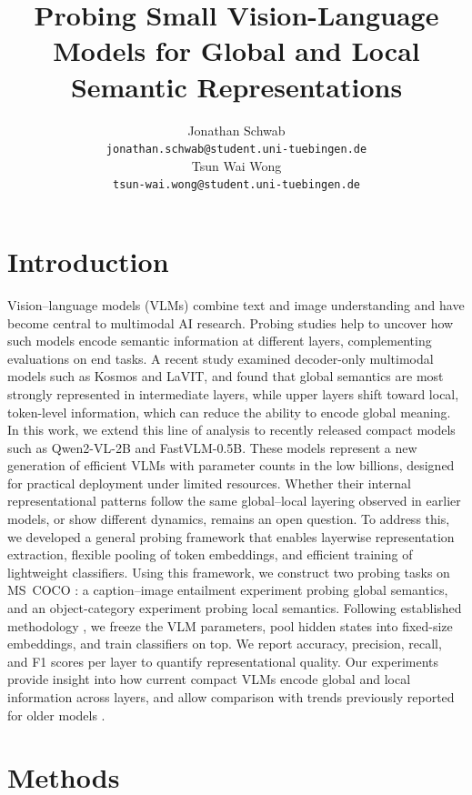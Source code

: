 \documentclass[11pt]{article}
\title{Probing Small Vision-Language
Models for Global and Local Semantic
Representations}
\author{Jonathan Schwab \\
  \texttt{jonathan.schwab@student.uni-tuebingen.de} \\\And
  Tsun Wai Wong \\
  \texttt{tsun-wai.wong@student.uni-tuebingen.de} \\}
\begin{document}
\maketitle
\begin{abstract}

\end{abstract}


\section{Introduction}
Vision--language models (VLMs) combine text and image understanding and have become central to multimodal AI research. Probing studies help to uncover how such models encode semantic information at different layers, complementing evaluations on end tasks. A recent study \cite{tao2024probingmultimodallargelanguage} examined decoder-only multimodal models such as Kosmos and LaVIT, and found that global semantics are most strongly represented in intermediate layers, while upper layers shift toward local, token-level information, which can reduce the ability to encode global meaning.
In this work, we extend this line of analysis to recently released compact models such as Qwen2-VL-2B and FastVLM-0.5B. These models represent a new generation of efficient VLMs with parameter counts in the low billions, designed for practical deployment under limited resources. Whether their internal representational patterns follow the same global–local layering observed in earlier models, or show different dynamics, remains an open question.
To address this, we developed a general probing framework that enables layerwise representation extraction, flexible pooling of token embeddings, and efficient training of lightweight classifiers. Using this framework, we construct two probing tasks on MS~COCO \cite{lin2014microsoft}: a caption–image entailment experiment probing global semantics, and an object-category experiment probing local semantics. Following established methodology \cite{alain2018understanding}, we freeze the VLM parameters, pool hidden states into fixed-size embeddings, and train classifiers on top. We report accuracy, precision, recall, and F1 scores per layer to quantify representational quality.
Our experiments provide insight into how current compact VLMs encode global and local information across layers, and allow comparison with trends previously reported for older models \cite{tao2024probingmultimodallargelanguage}.

\section{Methods}
\end{document}
